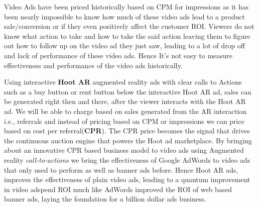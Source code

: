 Video Ads have been priced historically based on CPM for impressions as it has been nearly impossible to know how much of these video ads lead to a product sale/conversion or if they even positively affect the customer ROI. Viewers do not know what action to take and how to take the said action leaving them to figure out how to follow up on the video ad they just saw, leading to a lot of drop off and lack of performance of these video ads. Hence It’s not easy  to measure effectiveness and performance of the video ads historically.

Using interactive \textbf{Hoot AR} augmented reality  ads with clear
calls to Actions such as a buy button or rent button below the
interactive Hoot AR ad, sales can be generated right then and there,
after the viewer interacts with the Hoot AR ad. We will be able to
charge based on sales generated from the AR interaction i.e.,
referrals and instead of pricing based on CPM or impressions we can
price based on  cost per referral(\textbf{CPR}). The CPR price becomes
the signal that drives the continuous auction engine that powers the
Hoot ad marketplace. By bringing about an innovative CPR based
business model to video ads using Augmented reality
\emph{call-to-actions} we bring the effectiveness of Google AdWords to
video ads that only used to perform as well as banner ads
before. Hence Hoot AR ads, improves the effectiveness of plain video
ads, leading to a quantum improvement in video adspend ROI much like
AdWords improved the ROI of web based banner ads, laying the
foundation for a billion dollar ads business.